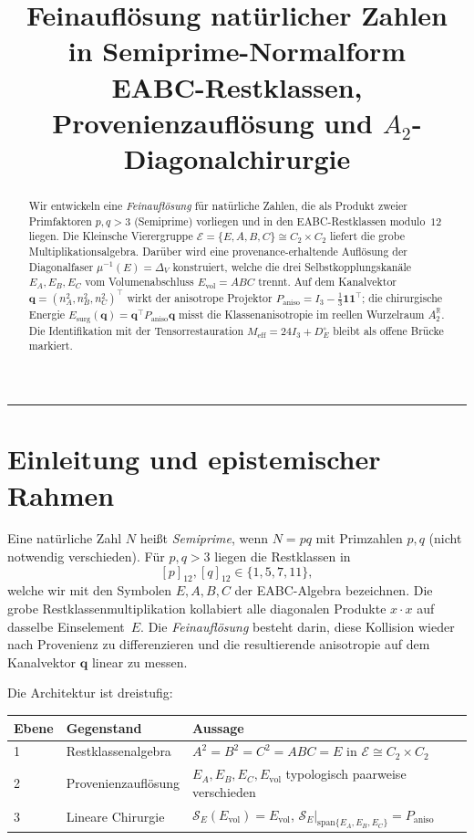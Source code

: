 \documentclass[11pt,a4paper]{article}
\title{Feinauflösung natürlicher Zahlen\\[0.35em]
	\large in Semiprime-Normalform\\[0.2em]
	\normalsize EABC-Restklassen, Provenienzauflösung und $A_2$-Diagonalchirurgie}
\author{}
\date{}
\theoremstyle{definition}
\theoremstyle{remark}
\newcommand{\E}{\mathcal{E}}
\newcommand{\R}{\mathbb{R}}
\newcommand{\one}{\mathbf{1}}
\newcommand{\qq}{\mathbf{q}}
\newcommand{\Pan}{P_{\mathrm{aniso}}}
\newcommand{\Evol}{E_{\mathrm{vol}}}
\newcommand{\Esurg}{E_{\mathrm{surg}}}
\begin{document}
	\maketitle
	
	\begin{abstract}
		\noindent
		Wir entwickeln eine \emph{Feinauflösung} für natürliche Zahlen, die als Produkt
		zweier Primfaktoren $p,q>3$ (Semiprime) vorliegen und in den EABC-Restklassen
		modulo~$12$ liegen. Die Kleinsche Vierergruppe
		$\E=\{E,A,B,C\}\cong C_2\times C_2$ liefert die grobe Multiplikationsalgebra.
		Darüber wird eine provenance-erhaltende Auflösung der Diagonalfaser
		$\mu^{-1}(E)=\Delta_V$ konstruiert, welche die drei Selbstkopplungskanäle
		$E_A,E_B,E_C$ vom Volumenabschluss $\Evol=ABC$ trennt.
		Auf dem Kanalvektor $\qq=(n_A^2,n_B^2,n_C^2)^\top$ wirkt der anisotrope
		Projektor $\Pan=I_3-\tfrac13\one\one^\top$; die chirurgische Energie
		$\Esurg(\qq)=\qq^\top\Pan\qq$ misst die Klassenanisotropie im reellen
		Wurzelraum $A_2^\R$. Die Identifikation mit der Tensorrestauration
		$M_{\mathrm{eff}}=24I_3+D_E^\circ$ bleibt als offene Brücke markiert.
	\end{abstract}
	
	\tableofcontents
	\vspace{1em}
	\hrule
	\vspace{1em}
	
	\section{Einleitung und epistemischer Rahmen}
	\label{sec:intro}
	
	Eine natürliche Zahl $N$ heißt \emph{Semiprime}, wenn
	$N=pq$ mit Primzahlen $p,q$ (nicht notwendig verschieden).
	Für $p,q>3$ liegen die Restklassen in
	\[
	[p]_{12},[q]_{12}\in\{1,5,7,11\},
	\]
	welche wir mit den Symbolen $E,A,B,C$ der EABC-Algebra bezeichnen.
	Die grobe Restklassenmultiplikation kollabiert alle diagonalen Produkte
	$x\cdot x$ auf dasselbe Einselement~$E$. Die \emph{Feinauflösung} besteht darin,
	diese Kollision wieder nach Provenienz zu differenzieren und die resultierende
	anisotropie auf dem Kanalvektor $\qq$ linear zu messen.
	
	Die Architektur ist dreistufig:
	
	\begin{center}
		\begin{tabular}{@{}llp{6.2cm}@{}}
			\toprule
			\textbf{Ebene} & \textbf{Gegenstand} & \textbf{Aussage} \\
			\midrule
			1 & Restklassenalgebra &
			$A^2=B^2=C^2=ABC=E$ in $\E\cong C_2\times C_2$ \\
			2 & Provenienzauflösung &
			$E_A,E_B,E_C,\Evol$ typologisch paarweise verschieden \\
			3 & Lineare Chirurgie &
			$\mathcal S_E(\Evol)=\Evol$,\;
			$\mathcal S_E\big|_{\mathrm{span}\{E_A,E_B,E_C\}}=\Pan$ \\
			\bottomrule
		\end{tabular}
	\end{center}
	
\end{document}
